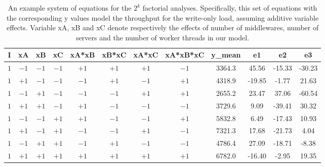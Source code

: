 \documentclass[11pt,a4paper]{article}
\begin{document}
\begin{table}[h]
\centering
\begin{tabular}{|c|c|c|c|c|c|c|c|c|c|c|c|}
\hline
I & xA & xB & xC & {\small xA*xB} & {\small xB*xC} & {\small xA*xC} & {\small xA*xB*xC} & y\_mean & e1 & e2 & e3 \\ 
\hline
$1$ & $-1$ & $-1$ & $-1$ & $+1$ & $+1$ & $+1$ & $-1$ & 3364.3 & 45.56 & -15.33 & -30.23 \\
\hline
$1$ & $+1$ & $-1$ & $-1$ & $-1$ & $+1$ & $-1$ & $+1$ & 4318.9 & -19.85 & -1.77 & 21.63 \\
\hline
$1$ & $-1$ & $+1$ & $-1$ & $-1$ & $-1$ & $+1$ & $+1$ & 2655.2 & 23.47 & 37.06 & -60.54 \\
\hline
$1$ & $+1$ & $+1$ & $-1$ & $+1$ & $-1$ & $-1$ & $-1$ & 3729.6 & 9.09 & -39.41 & 30.32 \\
\hline
$1$ & $-1$ & $-1$ & $+1$ & $+1$ & $-1$ & $-1$ & $+1$ & 5832.8 & 6.49 & -17.43 & 10.93 \\
\hline
$1$ & $+1$ & $-1$ & $+1$ & $-1$ & $-1$ & $+1$ & $-1$ & 7321.3 & 17.68 & -21.73 & 4.04 \\
\hline
$1$ & $-1$ & $+1$ & $+1$ & $-1$ & $+1$ & $-1$ & $-1$ & 4786.4 & 27.09 & -18.71 & -8.38 \\
\hline
$1$ & $+1$ & $+1$ & $+1$ & $+1$ & $+1$ & $+1$ & $+1$ & 6782.0 & -16.40 & -2.95 & 19.35 \\
\hline
\end{tabular}
\caption{An example system of equations for the $2^{k}$ factorial analyses. Specifically, this set of equations with the corresponding y values model the throughput for the write-only load, assuming additive variable effects. Variable xA, xB and xC denote respectively the effects of number of middlewares, number of servers and the number of worker threads in our model.} \label{tab:2k-example-table}
\end{table}
\end{document}
